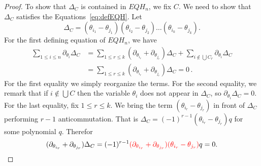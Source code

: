 \documentclass[11pt]{amsart}
\theoremstyle{definition}
\numberwithin{equation}{section}
\begin{document}
\begin{proof}
To show that  $\Delta_C$ is  contained in $EQH_n $, we fix $C$. We need to show that $\Delta_C$ satisfies the Equations~\eqref{eq:defEQH}.
Let 
 $$\Delta_C=(\theta_{i_1}-\theta_{j_1})(\theta_{i_2}-\theta_{j_2})\ldots (\theta_{i_k}-\theta_{j_k}).$$
For the first  defining equation of $EQH_n $, we have
\begin{align*}
 \sum_{1\le i\le n} \partial_{\theta_i}\Delta_C&=\sum_{1\le r\le k}  (\partial_{\theta_{i_r}}+\partial_{\theta_{j_r}})\Delta_C + \sum_{i\notin \bigcup C_r}  \partial_{\theta_i}\Delta_C\\
 &=\sum_{1\le r\le k}  (\partial_{\theta_{i_r}}+\partial_{\theta_{j_r}})\Delta_C =0\,.
  \end{align*}
For the first equality we simply reorganize the terms. For the second equality, we remark that if $i\notin \bigcup C$ then the variable $\theta_i$ does not appear in $\Delta_C$, so 
$ \partial_{\theta_i}\Delta_C=0$. For the last equality, fix $1\le r\le k$. We bring the term $(\theta_{i_r}-\theta_{j_r})$  in front  of $\Delta_C$ performing $r-1$ anticommutation. That is $\Delta_C =(-1)^{r-1}(\theta_{i_r}-\theta_{j_r}) q$ for some  polynomial $q$. Therefor
$$(\partial_{\theta_{i_r}}+\partial_{\theta_{j_r}})\Delta_C=(-1)^{r-1}
\textcolor{red}{(\partial_{\theta_{i_r}}+\partial_{\theta_{j_r}})(\theta_{i_r}-\theta_{j_r})}q =0.
$$


\end{proof}
\end{document}

